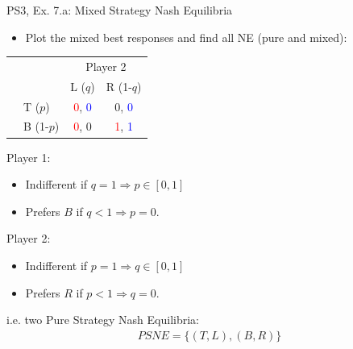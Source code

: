 \begin{frame}{PS3, Ex. 7.a: Mixed Strategy Nash Equilibria}
  \begin{multicols}{2}
    \begin{itemize}
      \item[(a)] Plot the mixed best responses and find all NE (pure and mixed):
    \end{itemize}
    \begin{table}
      \begin{tabular}{cl|c|c|}
        & \multicolumn{1}{c}{} & \multicolumn{2}{c}{\color{blue}Player 2}\\
        \parbox[t]{1mm}{}
          &  &  &  \\
          & T  ($p$)  & \textcolor{red}{0}, \textcolor{blue}{0} & 0, \textcolor{blue}{0} \\
          & B  (1-$p$)& \textcolor{red}{0}, 0 & \textcolor{red}{1}, \textcolor{blue}{1} \\
      \end{tabular}
    \end{table}
    Player 1:
    \begin{itemize}
      \item Indifferent if $q=1\Rightarrow p\in[0,1]$
      \item Prefers $B$ if $q<1\Rightarrow p=0$.
    \end{itemize}
    Player 2:
    \begin{itemize}
      \item Indifferent if $p=1\Rightarrow q\in[0,1]$
      \item Prefers $R$ if $p<1\Rightarrow q=0$.
    \end{itemize}
    i.e. two Pure Strategy Nash Equilibria:
    \begin{align*}
      PSNE=\{(T,L),(B,R)\}
    \end{align*}
  \vfill\null \columnbreak
  \vfill\null
  \end{multicols}
\end{frame}
